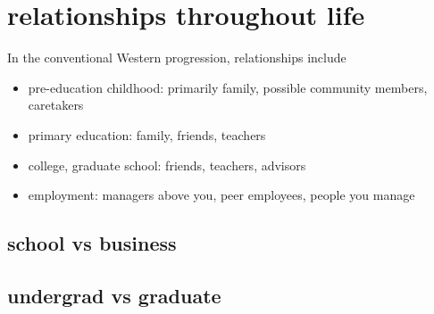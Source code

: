 \section{relationships throughout life}
In the conventional Western progression, relationships include
\begin{itemize}
    \item pre-education childhood: primarily family, possible community members, caretakers
    \item primary education: family, friends, teachers
    \item college, graduate school: friends, teachers, advisors
    \item employment: managers above you, peer employees, people you manage
\end{itemize}

\subsection{school vs business}

\subsection{undergrad vs graduate}
